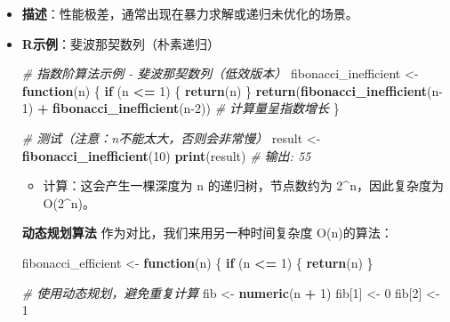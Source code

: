 \documentclass[
]{book}
\newenvironment{Shaded}{\begin{snugshade}}{\end{snugshade}}
\newcommand{\CommentTok}[1]{\textcolor[rgb]{0.56,0.35,0.01}{\textit{#1}}}
\newcommand{\ControlFlowTok}[1]{\textcolor[rgb]{0.13,0.29,0.53}{\textbf{#1}}}
\newcommand{\DecValTok}[1]{\textcolor[rgb]{0.00,0.00,0.81}{#1}}
\newcommand{\FunctionTok}[1]{\textcolor[rgb]{0.13,0.29,0.53}{\textbf{#1}}}
\newcommand{\NormalTok}[1]{#1}
\newcommand{\OtherTok}[1]{\textcolor[rgb]{0.56,0.35,0.01}{#1}}
\newcommand{\SpecialCharTok}[1]{\textcolor[rgb]{0.81,0.36,0.00}{\textbf{#1}}}
\providecommand{\tightlist}{%
  \setlength{\itemsep}{0pt}\setlength{\parskip}{0pt}}
\begin{document}
\begin{itemize}
\item
  \textbf{描述}：性能极差，通常出现在暴力求解或递归未优化的场景。
\item
  \textbf{R示例}：斐波那契数列（朴素递归）

\begin{Shaded}
\begin{Highlighting}[]
\CommentTok{\# 指数阶算法示例 {-} 斐波那契数列（低效版本）}
\NormalTok{fibonacci\_inefficient }\OtherTok{\textless{}{-}} \ControlFlowTok{function}\NormalTok{(n) \{}
  \ControlFlowTok{if}\NormalTok{ (n }\SpecialCharTok{\textless{}=} \DecValTok{1}\NormalTok{) \{}
    \FunctionTok{return}\NormalTok{(n)}
\NormalTok{  \}}
  \FunctionTok{return}\NormalTok{(}\FunctionTok{fibonacci\_inefficient}\NormalTok{(n}\DecValTok{{-}1}\NormalTok{) }\SpecialCharTok{+} \FunctionTok{fibonacci\_inefficient}\NormalTok{(n}\DecValTok{{-}2}\NormalTok{))  }\CommentTok{\# 计算量呈指数增长}
\NormalTok{\}}

\CommentTok{\# 测试（注意：n不能太大，否则会非常慢）}
\NormalTok{result }\OtherTok{\textless{}{-}} \FunctionTok{fibonacci\_inefficient}\NormalTok{(}\DecValTok{10}\NormalTok{)}
\FunctionTok{print}\NormalTok{(result)  }\CommentTok{\# 输出: 55}
\end{Highlighting}
\end{Shaded}

  \begin{itemize}
  \tightlist
  \item
    计算：这会产生一棵深度为 n 的递归树，节点数约为 2\^{}n，因此复杂度为 O(2\^{}n)。
  \end{itemize}

  \textbf{动态规划算法} 作为对比，我们来用另一种时间复杂度 O(n)的算法：

\begin{Shaded}
\begin{Highlighting}[]
\NormalTok{fibonacci\_efficient }\OtherTok{\textless{}{-}} \ControlFlowTok{function}\NormalTok{(n) \{}
  \ControlFlowTok{if}\NormalTok{ (n }\SpecialCharTok{\textless{}=} \DecValTok{1}\NormalTok{) \{}
    \FunctionTok{return}\NormalTok{(n)}
\NormalTok{\}}

\CommentTok{\# 使用动态规划，避免重复计算}
\NormalTok{fib }\OtherTok{\textless{}{-}} \FunctionTok{numeric}\NormalTok{(n }\SpecialCharTok{+} \DecValTok{1}\NormalTok{)}
\NormalTok{fib[}\DecValTok{1}\NormalTok{] }\OtherTok{\textless{}{-}} \DecValTok{0}
\NormalTok{fib[}\DecValTok{2}\NormalTok{] }\OtherTok{\textless{}{-}} \DecValTok{1}


\end{Highlighting}
\end{Shaded}
\end{itemize}
\end{document}
